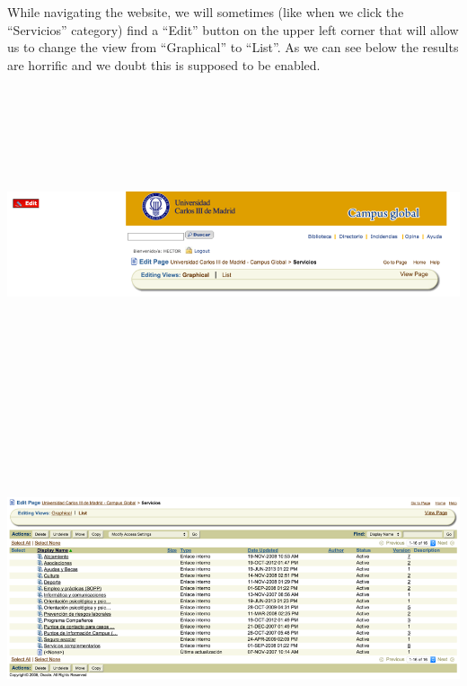 \documentclass{article}
\begin{document}
While navigating the website, we will sometimes (like when we click the “Servicios” category) find a “Edit” button on the upper left corner that will allow us to change the view from “Graphical” to “List”. As we can see below the results are horrific and we doubt this is supposed to be enabled. 
\vspace{0.5cm} \\
\includegraphics[width=15cm, height=10cm, keepaspectratio]{edit} 
\vspace{0.5cm} \\
\includegraphics[width=15cm, height=10cm, keepaspectratio]{editresult}
\end{document}
